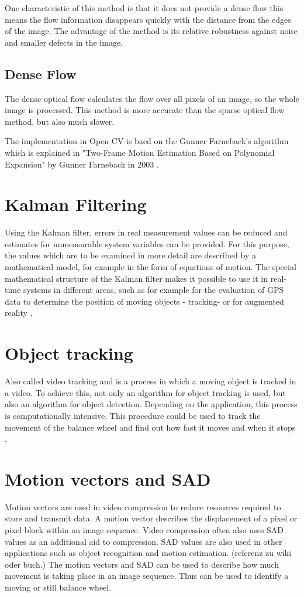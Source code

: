 \documentclass[12pt, a4paper]{report}
\begin{document}
    One characteristic of this method is that it does not provide a dense flow this means the flow information disappears quickly with the distance from the edges of the image. The advantage of the method is its relative robustness against noise and smaller defects in the image.
    
       \subsection{Dense Flow}
The dense optical flow calculates the flow over all pixels of an image, so the whole image is processed. This method is more accurate than the sparse optical flow method, but also much slower.

The implementation in Open CV is baed on the Gunner Farneback's algorithm which is explained in "Two-Frame Motion Estimation Based on Polynomial Expansion" by Gunner Farneback in 2003 \cite{Farneback2003}.
  
   \section{Kalman Filtering} 
   Using the Kalman filter, errors in real measurement values can be reduced and estimates for unmeasurable system variables can be provided. For this purpose, the values which are to be examined in more detail are described by a mathematical model, for example in the form of equations of motion. The special mathematical structure of the Kalman filter makes it possible to use it in real-time systems in different areas, such as for example for the evaluation of GPS data to determine the position of moving objects - tracking- or for augmented reality \cite{Grewal1993}.
   
   \section{Object tracking}
   Also called video tracking and is a process in which a moving object is tracked in a video. To achieve this, not only an algorithm for object tracking is used, but also an algorithm for object detection. Depending on the application, this process is computationally intensive. This procedure could be used to track the movement of the balance wheel and find out how fast it moves and when it stops \cite{objectTracking}.
    
 \section{Motion vectors and SAD}
 Motion vectors are used in video compression to reduce resources required to store and transmit data. A motion vector describes the displacement of a pixel or pixel block within an image sequence.
 Video compression often also uses SAD values as an additional aid to compression. SAD values are also used in other applications such as object recognition and motion estimation. (referenz zu wiki oder buch.)
 The motion vectors and SAD can be used to describe how much movement is taking place in an image sequence. Thus can be used to identify a moving or still balance wheel.
    
\end{document}

